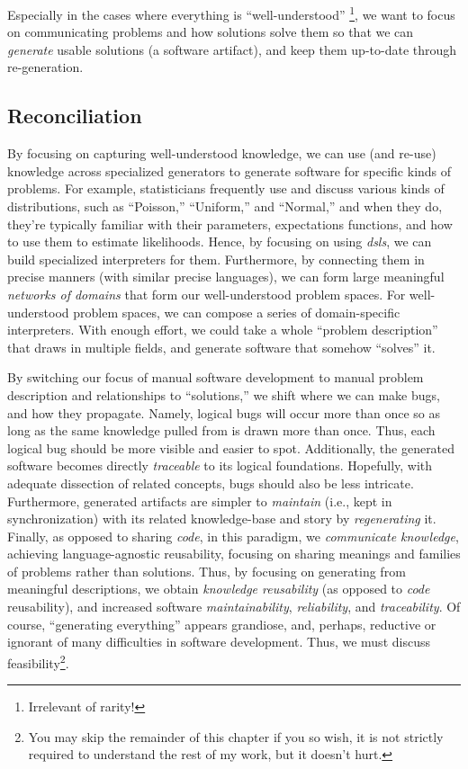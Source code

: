 Especially in the cases where everything is ``well-understood''
\cite{well-understood}\footnote{Irrelevant of rarity!}, we want to focus on
communicating problems and how solutions solve them so that we can
\textit{generate} usable solutions (a software artifact), and keep them
up-to-date through re-generation.

\subsection{Reconciliation}
\label{chap:ideology:sec:thoughts_of_generation:subsec:reconciliation}

By focusing on capturing well-understood \cite{well-understood} knowledge, we
can use (and re-use) knowledge across specialized generators to generate
software for specific kinds of problems. For example, statisticians frequently
use and discuss various kinds of distributions, such as ``Poisson,''
``Uniform,'' and ``Normal,'' and when they do, they're typically familiar with
their parameters, expectations functions, and how to use them to estimate
likelihoods. Hence, by focusing on using \textit{\acsp{dsl}}, we can build
specialized interpreters for them. Furthermore, by connecting them in precise
manners (with similar precise languages), we can form large meaningful
\textit{networks of domains} \cite{Czarnecki2005} that form our well-understood
problem spaces. For well-understood problem spaces, we can compose a series of
domain-specific interpreters. With enough effort, we could take a whole
``problem description'' that draws in multiple fields, and generate software
that somehow ``solves'' it.

By switching our focus of manual software development to manual problem
description and relationships to ``solutions,'' we shift where we can make bugs,
and how they propagate. Namely, logical bugs will occur more than once so as
long as the same knowledge pulled from is drawn more than once. Thus, each
logical bug should be more visible and easier to spot. Additionally, the
generated software becomes directly \textit{traceable} to its logical
foundations. Hopefully, with adequate dissection of related concepts, bugs
should also be less intricate. Furthermore, generated artifacts are simpler to
\textit{maintain} (i.e., kept in synchronization) with its related
knowledge-base and story by \textit{regenerating} it. Finally, as opposed to
sharing \textit{code}, in this paradigm, we \textit{communicate knowledge},
achieving language-agnostic reusability, focusing on sharing meanings and
families of problems rather than solutions. Thus, by focusing on generating from
meaningful descriptions, we obtain \textit{knowledge reusability} (as opposed to
\textit{code} reusability), and increased software \textit{maintainability},
\textit{reliability}, and \textit{traceability}. Of course, ``generating
everything'' appears grandiose, and, perhaps, reductive or ignorant of many
difficulties in software development. Thus, we must discuss
feasibility\footnote{You may skip the remainder of this chapter if you so wish,
it is not strictly required to understand the rest of my work, but it doesn't
hurt.}.

